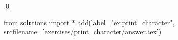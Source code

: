 
\begin{ex} 
  \label{ex:print_character}
  
  \qed
\end{ex} 
\begin{python0}
from solutions import *
add(label="ex:print_character",
    srcfilename='exercises/print_character/answer.tex') 
\end{python0}
